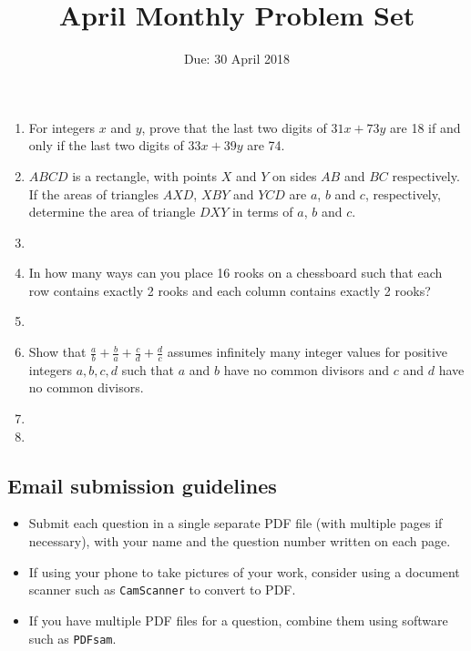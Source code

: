 \documentclass[12pt]{article}
\title{\vspace{-12pt}April Monthly Problem Set}
\author{Due: 30 April 2018}
\date{}
\begin{document}
 \maketitle \pagestyle{empty}

\begin{enumerate}

\item %
For integers $x$ and $y$, prove that the last two digits of $31x+73y$ are 18 if and only if the last two digits of $33x+39y$ are 74.


\item %
$ABCD$ is a rectangle, with points $X$ and $Y$ on sides $AB$ and $BC$ respectively. If the areas of triangles $AXD$, $XBY$ and $YCD$ are $a$, $b$ and $c$, respectively, determine the area of triangle $DXY$ in terms of $a$, $b$ and $c$.


\item %


\item %
In how many ways can you place 16 rooks on a chessboard such that each row contains exactly 2 rooks and each column contains exactly 2 rooks?


\item %


\item %
Show that $\displaystyle \frac{a}{b} +\frac{b}{a} +\frac{c}{d} +\frac{d}{c}$ assumes infinitely many integer values for positive integers $a,b,c,d$ such that $a$ and $b$ have no common divisors and $c$ and $d$ have no common divisors.


\item %


\item %

\end{enumerate}


\subsection*{Email submission guidelines}

\begin{itemize}
\item Submit each question in a single separate PDF file (with multiple pages if necessary), with your name and the question number written on each page.
\item If using your phone to take pictures of your work, consider using a document scanner such as \verb!CamScanner! to convert to PDF.
\item If you have multiple PDF files for a question, combine them using software such as \verb!PDFsam!.
\end{itemize}
\end{document}
